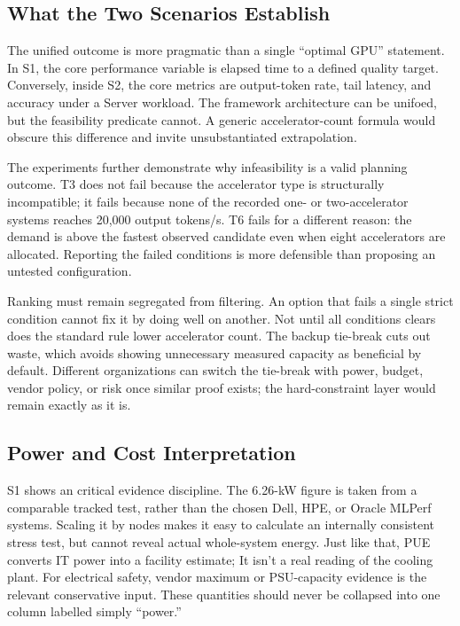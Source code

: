 \documentclass[final,3p,12pt,nopreprintline]{elsarticle}
\begin{document}
\subsection{What the Two Scenarios Establish}


The unified outcome is more pragmatic than a single “optimal GPU” statement. In S1, the core performance variable is elapsed time to a defined quality target. Conversely, inside S2, the core metrics are output-token rate, tail latency, and accuracy under a Server workload. The framework architecture can be unifoed, but the feasibility predicate cannot. A generic accelerator-count formula would obscure this difference and invite unsubstantiated extrapolation.


The experiments further demonstrate why infeasibility is a valid planning outcome. T3 does not fail because the accelerator type is structurally incompatible; it fails because none of the recorded one- or two-accelerator systems reaches 20,000 output tokens/s. T6 fails for a different reason: the demand is above the fastest observed candidate even when eight accelerators are allocated. Reporting the failed conditions is more defensible than proposing an untested configuration.


Ranking must remain segregated from filtering. An option that fails a single strict condition cannot fix it by doing well on another. Not until all conditions clears does the standard rule lower accelerator count. The backup tie-break cuts out waste, which avoids showing unnecessary measured capacity as beneficial by default. Different organizations can switch the tie-break with power, budget, vendor policy, or risk once similar proof exists; the hard-constraint layer would remain exactly as it is.


\subsection{Power and Cost Interpretation}


S1 shows an critical evidence discipline. The 6.26-kW figure is taken from a comparable tracked test, rather than the chosen Dell, HPE, or Oracle MLPerf systems. Scaling it by nodes makes it easy to calculate an internally consistent stress test, but cannot reveal actual whole-system energy. Just like that, PUE converts IT power into a facility estimate; It isn't a real reading of the cooling plant. For electrical safety, vendor maximum or PSU-capacity evidence is the relevant conservative input. These quantities should never be collapsed into one column labelled simply “power.”
\end{document}
